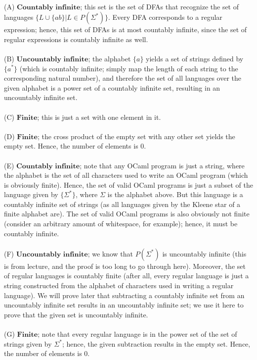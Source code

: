 \documentclass[solution, letterpaper]{cs121}
\begin{document}
\noindent\\(A) $\textbf{Countably infinite}$; this set is the set of DFAs that recognize the set of languages $\{L \cup \{ab\} | L \in P(\Sigma^*)\}$.  Every DFA corresponds to a regular expression; hence, this set of DFAs is at most countably infinite, since the set of regular expressions is countably infinite as well.
\noindent\\\\(B) $\textbf{Uncountably infinite}$; the alphabet $\{a\}$ yields a set of strings defined by $\{a^*\}$ (which is countably infinite; simply map the length of each string to the corresponding natural number), and therefore the set of all languages over the given alphabet is a power set of a countably infinite set, resulting in an uncountably infinite set.
\noindent\\\\(C) $\textbf{Finite}$; this is just a set with one element in it.
\noindent\\\\(D) $\textbf{Finite}$; the cross product of the empty set with any other set yields the empty set.  Hence, the number of elements is 0.
\noindent\\\\(E) $\textbf{Countably infinite}$; note that any OCaml program is just a string, where the alphabet is the set of all characters used to write an OCaml program (which is obviously finite).  Hence, the set of valid OCaml programs is just a subset of the language given by $\{\Sigma^*\}$, where $\Sigma$ is the alphabet above.  But this language is a countably infinite set of strings (as all languages given by the Kleene star of a finite alphabet are).  The set of valid OCaml programs is also obviously not finite (consider an arbitrary amount of whitespace, for example); hence, it must be countably infinite.
\noindent\\\\(F) $\textbf{Uncountably infinite}$; we know that $P(\Sigma^*)$ is uncountably infinite (this is from lecture, and the proof is too long to go through here).  Moreover, the set of regular languages is countably finite (after all, every regular language is just a string constructed from the alphabet of characters used in writing a regular language).  We will prove later that subtracting a countably infinite set from an uncountably infinite set results in an uncountably infinite set; we use it here to prove that the given set is uncountably infinite.
\noindent\\\\(G) $\textbf{Finite}$; note that every regular language is in the power set of the set of strings given by $\Sigma^*$; hence, the given subtraction results in the empty set.  Hence, the number of elements is 0.
\end{document}
